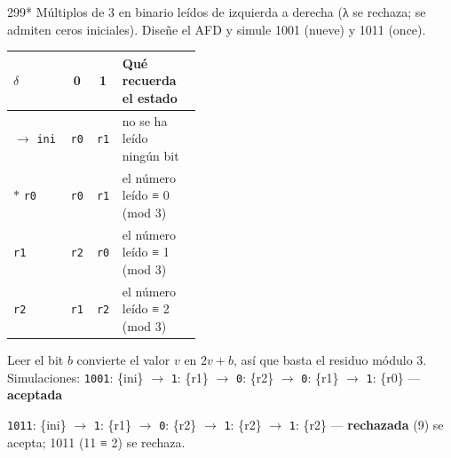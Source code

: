 \documentclass[11pt]{article}
\begin{document}
\begin{ejercicio}{299}{*}
Múltiplos de 3 en binario leídos de izquierda a derecha (λ se rechaza; se admiten ceros iniciales). Diseñe el AFD y simule 1001 (nueve) y 1011 (once).
\end{ejercicio}
\proc \begin{center}\small\begin{tabular}{lccp{0.42\linewidth}}\toprule
$\delta$ & 0 & 1 & Qué recuerda el estado \\\midrule
$\to$ \texttt{ini} & \texttt{r0} & \texttt{r1} & no se ha leído ningún bit \\
$*$ \texttt{r0} & \texttt{r0} & \texttt{r1} & el número leído ≡ 0 (mod 3) \\
 \texttt{r1} & \texttt{r2} & \texttt{r0} & el número leído ≡ 1 (mod 3) \\
 \texttt{r2} & \texttt{r1} & \texttt{r2} & el número leído ≡ 2 (mod 3) \\
\bottomrule\end{tabular}\end{center}
Leer el bit $b$ convierte el valor $v$ en $2v + b$, así que basta el residuo módulo 3. Simulaciones: \texttt{1001}: \{ini\} $\to$ \texttt{1}: \{r1\} $\to$ \texttt{0}: \{r2\} $\to$ \texttt{0}: \{r1\} $\to$ \texttt{1}: \{r0\} — \textbf{aceptada}\par \texttt{1011}: \{ini\} $\to$ \texttt{1}: \{r1\} $\to$ \texttt{0}: \{r2\} $\to$ \texttt{1}: \{r2\} $\to$ \texttt{1}: \{r2\} — \textbf{rechazada}
 (9) se acepta; 1011 (11 ≡ 2) se rechaza.
\end{document}
